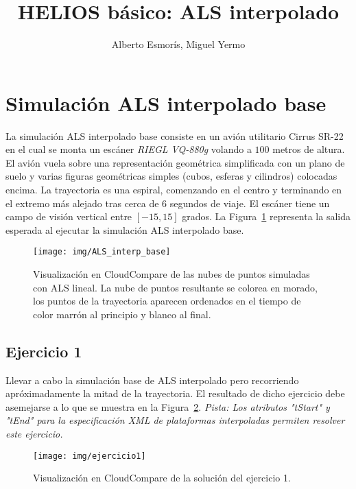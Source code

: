 \documentclass[]{article}
\title{HELIOS básico: ALS interpolado}
\author{Alberto Esmorís, Miguel Yermo}
\date{}
\begin{document}
	
	\maketitle
	
	
	
	\section*{Simulación ALS interpolado base}
	La simulación ALS interpolado base consiste en un avión utilitario Cirrus SR-22 en el cual se monta un escáner \textit{RIEGL VQ-880g} volando a $100$ metros de altura. El avión vuela sobre una representación geométrica simplificada con un plano de suelo y varias figuras geométricas simples (cubos, esferas y cilindros) colocadas encima. La trayectoria es una espiral, comenzando en el centro y terminando en el extremo más alejado tras cerca de 6 segundos de viaje. El escáner tiene un campo de visión vertical entre $[-15, 15]$ grados. La Figura~\ref{fig:als_interp_base} representa la salida esperada al ejecutar la simulación ALS interpolado base.
	
	\begin{figure}[htb]
		\centering
		\texttt{[image: img/ALS\_interp\_base]}
		\caption{Visualización en CloudCompare de las nubes de puntos simuladas con ALS lineal. La nube de puntos resultante se colorea en morado, los puntos de la trayectoria aparecen ordenados en el tiempo de color marrón al principio y blanco al final.}
		\label{fig:als_interp_base}
	\end{figure}


	\pagebreak
	

	\subsection*{Ejercicio 1}
	Llevar a cabo la simulación base de ALS interpolado pero recorriendo apróximadamente la mitad de la trayectoria. El resultado de dicho ejercicio debe asemejarse a lo que se muestra en la Figura~\ref{fig:ejercicio1}. \textit{Pista: Los atributos "tStart" y "tEnd" para la especificación XML de plataformas interpoladas permiten resolver este ejercicio.}
	
	\begin{figure}[htb]
		\centering
		\texttt{[image: img/ejercicio1]}
		\caption{Visualización en CloudCompare de la solución del ejercicio 1.}
		\label{fig:ejercicio1}
	\end{figure}
\end{document}
